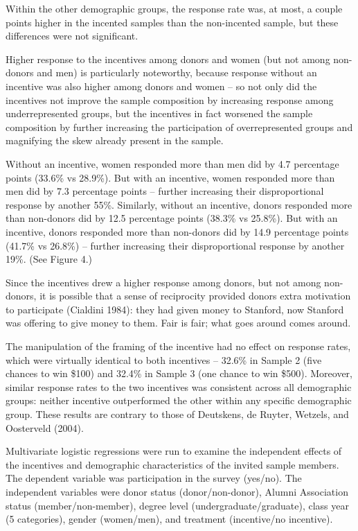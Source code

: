 \documentclass[12pt]{article}
\begin{document}
Within the other demographic groups, the response rate was, at most, a couple points higher in the incented samples than the non-incented sample, but these differences were not significant.

Higher response to the incentives among donors and women (but not among non-donors and men) is particularly noteworthy, because response without an incentive was also higher among donors and women – so not only did the incentives not improve the sample composition by increasing response among underrepresented groups, but the incentives in fact worsened the sample composition by further increasing the participation of overrepresented groups and magnifying the skew already present in the sample.

Without an incentive, women responded more than men did by 4.7 percentage points (33.6\% vs 28.9\%).  But with an incentive, women responded more than men did by 7.3 percentage points – further increasing their disproportional response by another 55\%.  Similarly, without an incentive, donors responded more than non-donors did by 12.5 percentage points (38.3\% vs 25.8\%).  But with an incentive, donors responded more than non-donors did by 14.9 percentage points (41.7\% vs 26.8\%) – further increasing their disproportional response by another 19\%.  (See Figure 4.)

Since the incentives drew a higher response among donors, but not among non-donors, it is possible that a sense of reciprocity provided donors extra motivation to participate (Cialdini 1984): they had given money to Stanford, now Stanford was offering to give money to them.  Fair is fair; what goes around comes around.

The manipulation of the framing of the incentive had no effect on response rates, which were virtually identical to both incentives – 32.6\% in Sample 2 (five chances to win \$100) and 32.4\% in Sample 3 (one chance to win \$500).  Moreover, similar response rates to the two incentives was consistent across all demographic groups: neither incentive outperformed the other within any specific demographic group.  These results are contrary to those of Deutskens, de Ruyter, Wetzels, and Oosterveld (2004).

Multivariate logistic regressions were run to examine the independent effects of the incentives and demographic characteristics of the invited sample members.  The dependent variable was participation in the survey (yes/no).  The independent variables were donor status (donor/non-donor), Alumni Association status (member/non-member), degree level (undergraduate/graduate), class year (5 categories), gender (women/men), and treatment (incentive/no incentive).
\end{document}
